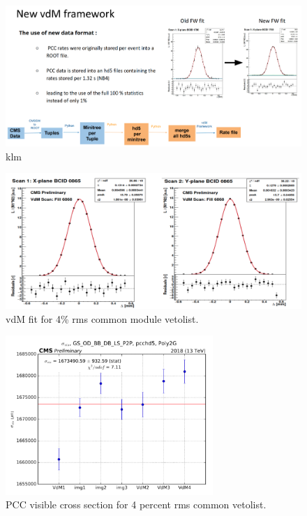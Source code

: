 \begin{figure}[!htp]
\centering
\includegraphics[width=1\textwidth]{ashish_thesis/new_framework_vdm.png}
\caption{%
   klm
}
\label{fig:vdm_new_f}
\end{figure}



\begin{figure}[!htp]
\centering
\includegraphics[width=1\textwidth]{ashish_thesis/vdm_fit_4per_rms_veto.png}
\caption{%
   vdM fit for 4\% rms common module vetolist.
}
\label{fig:vdm_fit_4rms}
\end{figure}





\begin{figure}[!htp]
\centering
\includegraphics[width=0.7\textwidth]{ashish_thesis/sigmavis_4per_rms.png}
\caption{%
   PCC visible cross section for 4 percent rms common vetolist.
}
\label{fig:sigmavis_4rms}
\end{figure}


